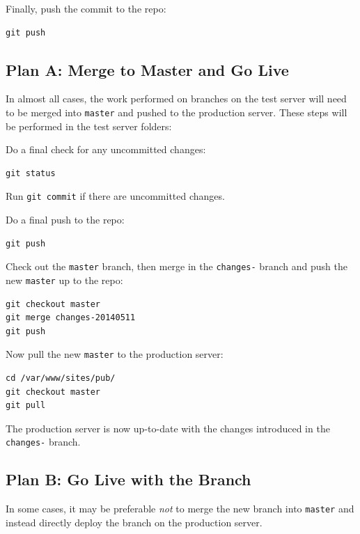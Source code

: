 \documentclass[pdflatex,letterpaper,twoside,12pt]{book}
\begin{document}
Finally, push the commit to the repo:

\begin{verbatim}
git push
\end{verbatim}

\subsection{Plan A: Merge to Master and Go Live}\label{publish-plan-a}

In almost all cases, the work performed on branches on the test server will need to be merged into \texttt{master} and pushed to the production server.  These steps will be performed in the test server folders:

Do a final check for any uncommitted changes:

\begin{verbatim}
git status
\end{verbatim}

Run \texttt{git commit} if there are uncommitted changes.

Do a final push to the repo:

\begin{verbatim}
git push
\end{verbatim}

Check out the \texttt{master} branch, then merge in the \texttt{changes-} branch and push the new \texttt{master} up to the repo:

\begin{verbatim}
git checkout master
git merge changes-20140511
git push
\end{verbatim}

Now pull the new \texttt{master} to the production server:

\begin{verbatim}
cd /var/www/sites/pub/
git checkout master
git pull
\end{verbatim}

The production server is now up-to-date with the changes introduced in the \texttt{changes-} branch.

\subsection{Plan B: Go Live with the Branch}

In some cases, it may be preferable \emph{not} to merge the new branch into \texttt{master} and instead directly deploy the branch on the production server.
\end{document}
